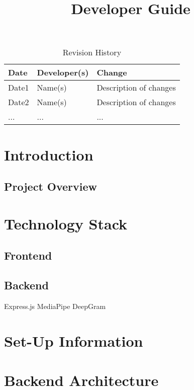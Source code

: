 \documentclass{article}
\title{Developer Guide\\\progname}
\author{\authname}
\date{}
\begin{document}
\maketitle
\newpage

\begin{table}[h!]
\caption{Revision History} \label{TblRevisionHistory}
\begin{tabularx}{\textwidth}{llX}
\toprule
\textbf{Date} & \textbf{Developer(s)} & \textbf{Change}\\
\midrule
Date1 & Name(s) & Description of changes\\
Date2 & Name(s) & Description of changes\\
... & ... & ...\\
\bottomrule
\end{tabularx}
\end{table}

\newpage


\tableofcontents

\section{Introduction}
\subsection{Project Overview}

\section{Technology Stack}
\subsection{Frontend}
\subsection{Backend}
Express.js 
MediaPipe 
DeepGram


\section{Set-Up Information}
\section{Backend Architecture}
\end{document}
